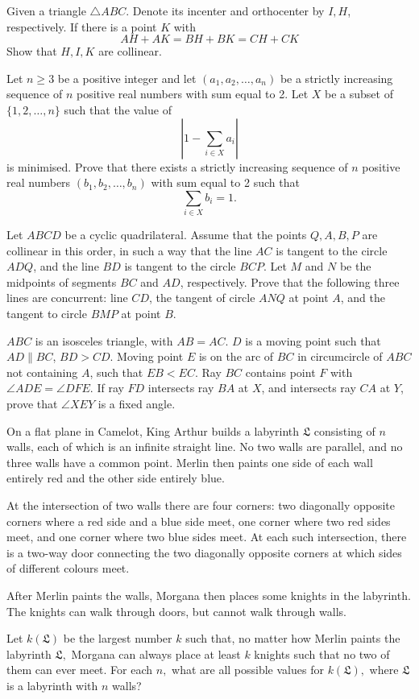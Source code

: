 \documentclass[11pt]{scrartcl}
\begin{document}
\begin{problem}[3906812380515301028]
Given a triangle $ \triangle ABC $. Denote its incenter and orthocenter by $ I, H $, respectively. If there is a point $ K $ with$$ AH+AK = BH+BK = CH+CK $$Show that $ H, I, K $ are collinear.
\end{problem}
\begin{problem}[290912955085727393]
Let $n \geqslant 3$ be a positive integer and let $\left(a_{1}, a_{2}, \ldots, a_{n}\right)$ be a strictly increasing sequence of $n$ positive real numbers with sum equal to 2. Let $X$ be a subset of $\{1,2, \ldots, n\}$ such that the value of
\[
\left|1-\sum_{i \in X} a_{i}\right|
\]is minimised. Prove that there exists a strictly increasing sequence of $n$ positive real numbers $\left(b_{1}, b_{2}, \ldots, b_{n}\right)$ with sum equal to 2 such that
\[
\sum_{i \in X} b_{i}=1.
\]
\end{problem}
\begin{problem}[6193947856984766386]
Let $ABCD$ be a cyclic quadrilateral. Assume that the points $Q, A, B, P$ are collinear in this order, in such a way that the line $AC$ is tangent to the circle $ADQ$, and the line $BD$ is tangent to the circle $BCP$. Let $M$ and $N$ be the midpoints of segments $BC$ and $AD$, respectively. Prove that the following three lines are concurrent: line $CD$, the tangent of circle $ANQ$ at point $A$, and the tangent to circle $BMP$ at point $B$.
\end{problem}
\begin{problem}[215375559035207]
$ABC$ is an isosceles triangle, with $AB=AC$. $D$ is a moving point such that $AD\parallel BC$, $BD>CD$. Moving point $E$ is on the arc of $BC$ in circumcircle of $ABC$ not containing $A$, such that $EB<EC$. Ray $BC$ contains point $F$ with $\angle ADE=\angle DFE$. If ray $FD$ intersects ray $BA$ at $X$, and intersects ray $CA$ at $Y$, prove that $\angle XEY$ is a fixed angle.
\end{problem}
\begin{problem}[2252133047011954512]
On a flat plane in Camelot, King Arthur builds a labyrinth $\mathfrak{L}$ consisting of $n$ walls, each of which is an infinite straight line. No two walls are parallel, and no three walls have a common point. Merlin then paints one side of each wall entirely red and the other side entirely blue.

At the intersection of two walls there are four corners: two diagonally opposite corners where a red side and a blue side meet, one corner where two red sides meet, and one corner where two blue sides meet. At each such intersection, there is a two-way door connecting the two diagonally opposite corners at which sides of different colours meet.

After Merlin paints the walls, Morgana then places some knights in the labyrinth. The knights can walk through doors, but cannot walk through walls.

Let $k(\mathfrak{L})$ be the largest number $k$ such that, no matter how Merlin paints the labyrinth $\mathfrak{L},$ Morgana can always place at least $k$ knights such that no two of them can ever meet. For each $n,$ what are all possible values for $k(\mathfrak{L}),$ where $\mathfrak{L}$ is a labyrinth with $n$ walls?
\end{problem}
\end{document}
